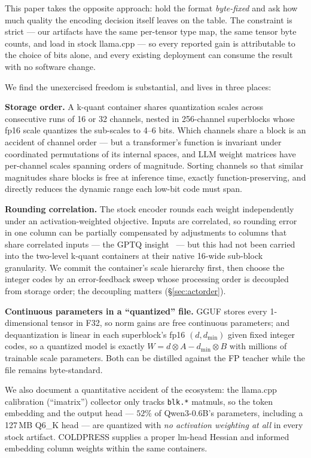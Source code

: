 \documentclass[11pt]{article}
\begin{document}
This paper takes the opposite approach: hold the format \emph{byte-fixed} and ask how
much quality the encoding decision itself leaves on the table. The constraint is
strict --- our artifacts have the same per-tensor type map, the same tensor byte
counts, and load in stock llama.cpp --- so every reported gain is attributable to the
choice of bits alone, and every existing deployment can consume the result with no
software change.

We find the unexercised freedom is substantial, and lives in three places:

\textbf{Storage order.} A k-quant container shares quantization scales across
consecutive runs of 16 or 32 channels, nested in 256-channel superblocks whose fp16
scale quantizes the sub-scales to 4--6 bits. Which channels share a block is an
accident of channel order --- but a transformer's function is invariant under
coordinated permutations of its internal spaces, and LLM weight matrices have
per-channel scales spanning orders of magnitude. Sorting channels so that similar
magnitudes share blocks is free at inference time, exactly function-preserving, and
directly reduces the dynamic range each low-bit code must span.

\textbf{Rounding correlation.} The stock encoder rounds each weight independently
under an activation-weighted objective. Inputs are correlated, so rounding error in
one column can be partially compensated by adjustments to columns that share
correlated inputs --- the GPTQ insight~\cite{gptq} --- but this had not been carried
into the two-level k-quant containers at their native 16-wide sub-block granularity.
We commit the container's scale hierarchy first, then choose the integer codes by an
error-feedback sweep whose processing order is decoupled from storage order; the
decoupling matters (\S\ref{sec:actorder}).

\textbf{Continuous parameters in a ``quantized'' file.} GGUF stores every
1-dimensional tensor in F32, so norm gains are free continuous parameters; and
dequantization is linear in each superblock's fp16 $(d, d_{\min})$ given fixed integer
codes, so a quantized model is exactly $W = d \otimes A - d_{\min} \otimes B$ with
millions of trainable scale parameters. Both can be distilled against the FP teacher
while the file remains byte-standard.

We also document a quantitative accident of the ecosystem: the llama.cpp calibration
(``imatrix'') collector only tracks \texttt{blk.*} matmuls, so the token embedding and
the output head --- $52\%$ of Qwen3-0.6B's parameters, including a 127\,MB Q6\_K
head --- are quantized with \emph{no activation weighting at all} in every stock
artifact. COLDPRESS supplies a proper lm-head Hessian and informed embedding column
weights within the same containers.
\end{document}
